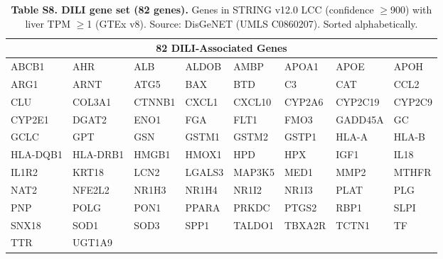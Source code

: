 \begin{table}[ht]
\centering
\caption{\textbf{Table S8. DILI gene set (82 genes).}
Genes in STRING v12.0 LCC (confidence $\geq$900) with liver TPM $\geq$1 (GTEx v8).
Source: DisGeNET (UMLS C0860207). Sorted alphabetically.}
\label{tab:S8}
\vspace{0.5em}
\scriptsize
\begin{tabular}{llll|llll}
\toprule
\multicolumn{8}{c}{\textbf{82 DILI-Associated Genes}} \\
\midrule
ABCB1 & AHR & ALB & ALDOB & AMBP & APOA1 & APOE & APOH \\
ARG1 & ARNT & ATG5 & BAX & BTD & C3 & CAT & CCL2 \\
CLU & COL3A1 & CTNNB1 & CXCL1 & CXCL10 & CYP2A6 & CYP2C19 & CYP2C9 \\
CYP2E1 & DGAT2 & ENO1 & FGA & FLT1 & FMO3 & GADD45A & GC \\
GCLC & GPT & GSN & GSTM1 & GSTM2 & GSTP1 & HLA-A & HLA-B \\
HLA-DQB1 & HLA-DRB1 & HMGB1 & HMOX1 & HPD & HPX & IGF1 & IL18 \\
IL1R2 & KRT18 & LCN2 & LGALS3 & MAP3K5 & MED1 & MMP2 & MTHFR \\
NAT2 & NFE2L2 & NR1H3 & NR1H4 & NR1I2 & NR1I3 & PLAT & PLG \\
PNP & POLG & PON1 & PPARA & PRKDC & PTGS2 & RBP1 & SLPI \\
SNX18 & SOD1 & SOD3 & SPP1 & TALDO1 & TBXA2R & TCTN1 & TF \\
TTR & UGT1A9 & & & & & & \\
\bottomrule
\end{tabular}
\end{table}

